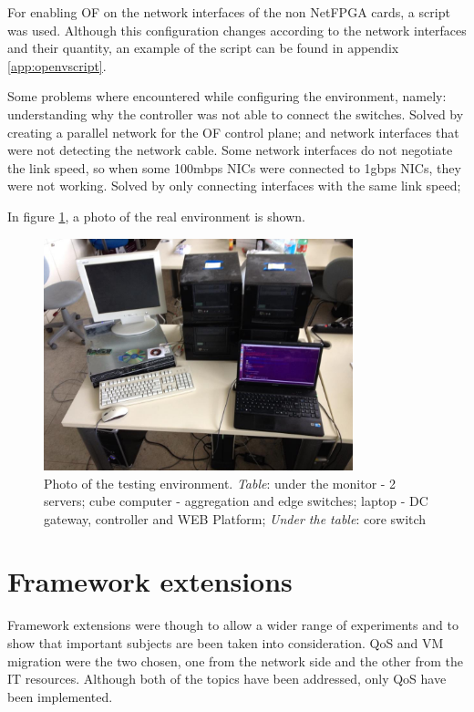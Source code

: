 \documentclass[12pt,english,oneside]{book}
\begin{document}
For enabling OF on the network interfaces of the non NetFPGA cards, a script was used. Although this configuration changes according to the network interfaces and their quantity, an example of the script can be found in appendix \ref{app:openvscript}.

Some problems where encountered while configuring the environment, namely: understanding why the controller was not able to connect the switches. Solved by creating a parallel network for the OF control plane; and network interfaces that were not detecting the network cable. Some network interfaces do not negotiate the link speed, so when some 100mbps NICs were connected to 1gbps NICs, they were not working. Solved by only connecting interfaces with the same link speed;

In figure \ref{fig:realenv}, a photo of the real environment is shown.

\begin{figure}[h!tbp]
        \centering
        \includegraphics[width=0.8\textwidth]{figures/realenvironment.jpg}
        \caption{Photo of the testing environment. \textit{Table}: under the monitor - 2 servers; cube computer - aggregation and edge switches; laptop - DC gateway, controller and WEB Platform; \textit{Under the table}: core switch}
        \label{fig:realenv}
\end{figure}
\newpage

\section{Framework extensions \label{Sec:fraext} }
\hspace{0.6cm}

Framework extensions were though to allow a wider range of experiments and to show that important subjects are been taken into consideration. QoS and VM migration were the two chosen, one from the network side and the other from the IT resources. Although both of the topics have been addressed, only QoS have been implemented.
\end{document}
